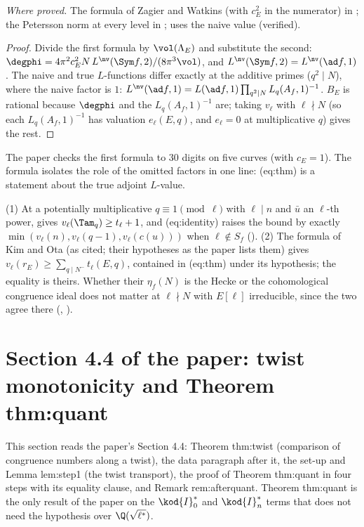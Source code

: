 \begin{sloppypar}
\noindent\emph{Where proved.} The formula of Zagier and Watkins (with $c_E^2$ in the numerator) in ; the Petersson norm at every level in ;
\cite[Lemma 2.12]{DFG04} uses the naive value (verified).

\begin{proof}
Divide the first formula by $\vol(\Lambda_E)$ and substitute the second: $\degphi=4\pi^2c_E^2N\,L^{\nv}(\Sym f,2)/(8\pi^3\vol)$, and $L^{\nv}(\Sym f,2)=L^{\nv}(\ad f,1)$. The naive and true $L$-functions
differ exactly at the additive primes ($q^2\mid N$), where the naive factor is $1$: $L^{\nv}(\ad f,1)=L(\ad f,1)\prod_{q^2\mid N}L_q(A_f,1)^{-1}$. $B_E$ is rational because $\degphi$ and the $L_q(A_f,1)^{-1}$
are; taking $v_\ell$ with $\ell\nmid N$ (so each $L_q(A_f,1)^{-1}$ has valuation $e_\ell(E,q)$, and $e_\ell=0$ at multiplicative $q$) gives the rest.
\end{proof}

\noindent The paper checks the first formula to $30$ digits on five curves (with $c_E=1$). The formula isolates the role of the omitted
factors in one line: (eq:thm) is a statement about the true adjoint $L$-value.

\begin{remark}\label{rem:paper:ko}
(1) At a potentially multiplicative $q\equiv1\pmod\ell$ with $\ell\mid n$ and $\bar u$ an $\ell$-th power,  gives $v_\ell(\Tam_q)\ge t_\ell+1$, and (eq:identity) raises the bound by
exactly $\min(v_\ell(n),v_\ell(q-1),v_\ell(c(u)))$ when $\ell\notin S_f$ (). (2) The formula of Kim and Ota \cite[Theorem 1.3, Definition 1.15]{KimOta} (as cited; their
hypotheses as the paper lists them) gives $v_\ell(r_E)\ge\sum_{q\mid N^-}t_\ell(E,q)$, contained in (eq:thm) under its hypothesis; the equality is theirs. Whether their $\eta_f(N)$ is the Hecke or
the cohomological congruence ideal does not matter at $\ell\nmid N$ with $E[\ell]$ irreducible, since the two agree there (, ).
\end{remark}

\section[Paper 4.4: Theorem thm:quant]{Section 4.4 of the paper: twist monotonicity and Theorem thm:quant}\label{sec:paper:twisting}

This section reads the paper's Section 4.4: Theorem thm:twist (comparison of congruence numbers along a twist), the data paragraph after it, the set-up
and Lemma lem:step1 (the twist transport), the proof of Theorem thm:quant in four steps with its equality clause, and Remark rem:afterquant. Theorem thm:quant is
the only result of the paper on the $\kod{I}_0^*$ and $\kod{I}_n^*$ terms that does not need the hypothesis over $\Q(\sqrt{\ell^*})$.


\end{sloppypar}
